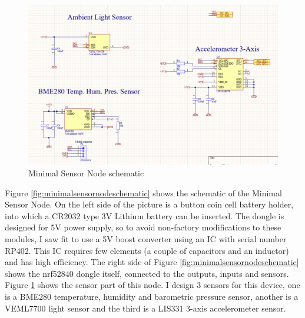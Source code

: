\begin{figure}[!htb]
    \centering
    \includegraphics[width=\textwidth]{img/minimalsensornodeschematicssensors.png}
    \caption{Minimal Sensor Node schematic}
    \label{fig:minimalsensornodeschematicssensor}
\end{figure}
\noindent
Figure \ref{fig:minimalsensornodeschematic} shows the schematic of the Minimal Sensor Node. On the left side of the picture is a button coin cell battery holder, into which a CR2032 type 3V Lithium battery can be inserted. The dongle is designed for 5V power supply, so to avoid non-factory modifications to these modules, I saw fit to use a 5V boost converter using an IC with serial number RP402. This IC requires few elements (a couple of capacitors and an inductor) and has high efficiency. The right side of Figure \ref{fig:minimalsensornodeschematic} shows the nrf52840 dongle itself, connected to the outputs, inputs and sensors. Figure \ref{fig:minimalsensornodeschematicssensor} shows the sensor part of this node. I design 3 sensors for this device, one is a BME280 temperature, humidity and barometric pressure sensor, another is a VEML7700 light sensor and the third is a LIS331 3-axis accelerometer sensor.


